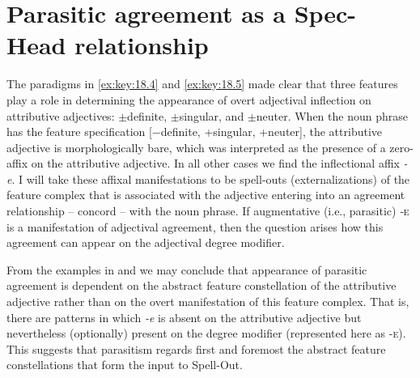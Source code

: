 \documentclass[output=paper]{langsci/langscibook}
\begin{document}
\section{Parasitic agreement as a Spec-Head relationship}\label{sec:key:18.7}

The paradigms in \eqref{ex:key:18.4} and \eqref{ex:key:18.5} made clear that
three features play a role in determining the appearance of overt adjectival
inflection on  attributive adjectives: $\pm$definite, $\pm$singular,
and $\pm$neuter. When the noun phrase has the feature specification [−definite,
+singular, +neuter], the attributive adjective is morphologically bare, which
was interpreted as the presence of a zero-affix on the attributive adjective.
In all other cases we find the inflectional affix \emph{-e}. I will take these
affixal manifestations to be spell-outs (externalizations) of the feature
complex that is associated with the adjective entering into an agreement
relationship -- concord -- with the noun phrase. If augmentative (i.e.,
parasitic) \textsc{‑e} is a manifestation of adjectival agreement, then the
question arises how this agreement can appear on the adjectival degree
modifier.

From the examples in  and  we may conclude that
appearance of parasitic agreement is dependent on the abstract feature
constellation of the attributive adjective rather than on the overt
manifestation of this feature complex. That is, there are patterns in which
\emph{-e} is absent on the attributive adjective but nevertheless (optionally)
present on the degree modifier (represented here as \textsc{-e}). This suggests
that parasitism regards first and foremost the abstract feature constellations
that form the input to Spell-Out.
\end{document}
